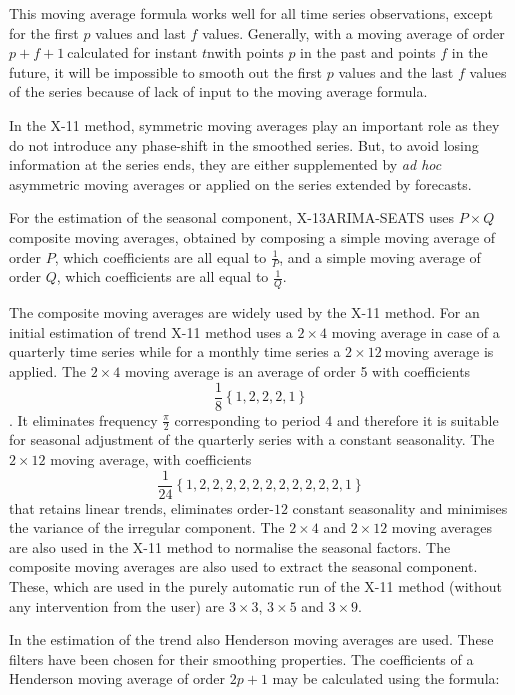 \documentclass[
]{book}
\begin{document}
This moving average formula works well for all time series observations,
except for the first \(p\) values and last \(f\) values. Generally, with a
moving average of order \(p + f + 1\ \)calculated for instant
\(t\)nwith points \(p\) in the past and points \(f\) in the
future, it will be impossible to smooth out the first \(p\) values and the
last \(f\) values of the series because of lack of input to the moving
average formula.

In the X-11 method, symmetric moving averages play an important role as
they do not introduce any phase-shift in the smoothed series. But, to
avoid losing information at the series ends, they are either
supplemented by \emph{ad hoc} asymmetric moving averages or applied on the
series extended by forecasts.

For the estimation of the seasonal component, X-13ARIMA-SEATS uses
\(P \times Q\) composite moving averages, obtained by composing a simple
moving average of order \(P\), which coefficients are all equal to
\(\frac{1}{P}\), and a simple moving average of order \(Q\), which
coefficients are all equal to \(\frac{1}{Q}\).

The composite moving averages are widely used by the X-11 method. For an
initial estimation of trend X-11 method uses a \(2 \times 4\) moving
average in case of a quarterly time series while for a monthly time
series a \(2 \times 12\ \)moving average is applied. The \(2 \times 4\)
moving average is an average of order 5 with coefficients
\[\frac{1}{8}\left\{1, 2, 2, 2, 1\right\}\]. It eliminates frequency
\(\frac{\pi}{2}\) corresponding to period 4 and therefore it is suitable
for seasonal adjustment of the quarterly series with a constant
seasonality. The \(2 \times 12\) moving average, with coefficients
\[\frac{1}{24}\left\{1, 2, 2, 2, 2, 2, 2, 2, 2, 2, 2, 2, 1\right\} \]that
retains linear trends, eliminates order-\(12\) constant seasonality and
minimises the variance of the irregular component. The \(2 \times 4\) and
\(2 \times 12\) moving averages are also used in the X-11 method to
normalise the seasonal factors. The composite moving averages are also
used to extract the seasonal component. These, which are used in the
purely automatic run of the X-11 method (without any intervention from
the user) are \(3 \times 3\), \(3 \times 5\) and \(3 \times 9\).

In the estimation of the trend also Henderson moving averages are used.
These filters have been chosen for their smoothing properties. The
coefficients of a Henderson moving average of order \(2p + 1\) may be
calculated using the formula:
\end{document}
